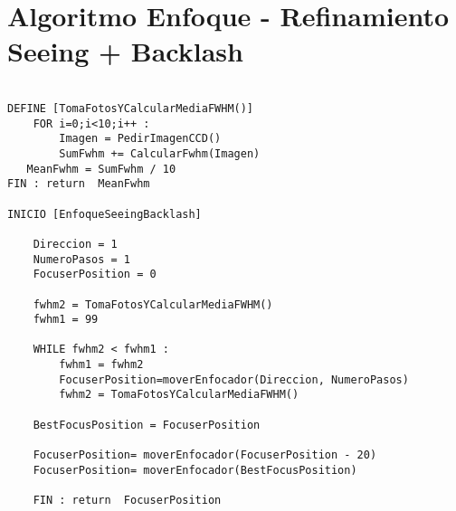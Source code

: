 \documentclass{article}
\begin{document}
\newpage
\section{Algoritmo Enfoque  - Refinamiento Seeing + Backlash }

\begin{verbatim}

DEFINE [TomaFotosYCalcularMediaFWHM()]
    FOR i=0;i<10;i++ :  
        Imagen = PedirImagenCCD()
        SumFwhm += CalcularFwhm(Imagen)
   MeanFwhm = SumFwhm / 10
FIN : return  MeanFwhm

INICIO [EnfoqueSeeingBacklash]

    Direccion = 1
    NumeroPasos = 1
    FocuserPosition = 0
      
    fwhm2 = TomaFotosYCalcularMediaFWHM()
    fwhm1 = 99
    
    WHILE fwhm2 < fwhm1 :
        fwhm1 = fwhm2
        FocuserPosition=moverEnfocador(Direccion, NumeroPasos)
        fwhm2 = TomaFotosYCalcularMediaFWHM()

    BestFocusPosition = FocuserPosition

    FocuserPosition= moverEnfocador(FocuserPosition - 20)
    FocuserPosition= moverEnfocador(BestFocusPosition)
        
    FIN : return  FocuserPosition 

\end{verbatim} 
\end{document}

